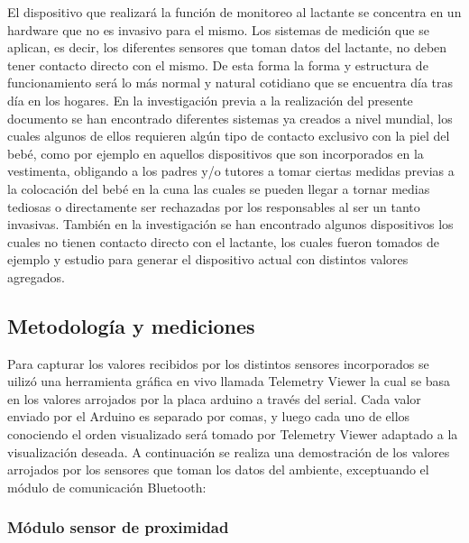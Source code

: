 \documentclass{IEEEtran}
\begin{document}
		El dispositivo que realizará la función de monitoreo al lactante se concentra en un hardware que no es invasivo para el mismo. Los sistemas de medición que se aplican, es decir, los diferentes sensores que toman datos del lactante, no deben tener contacto directo con el mismo. De esta forma la forma y estructura de funcionamiento será lo más normal y natural cotidiano que se encuentra día tras día en los hogares. En la investigación previa a la realización del presente documento se han encontrado diferentes sistemas ya creados a nivel mundial, los cuales algunos de ellos requieren algún tipo de contacto exclusivo con la piel del bebé, como por ejemplo en aquellos dispositivos que son incorporados en la vestimenta, obligando a los padres y/o tutores a tomar ciertas medidas previas a la colocación del bebé en la cuna las cuales se pueden llegar a tornar medias tediosas o directamente ser rechazadas por los responsables al ser un tanto invasivas. También en la investigación se han encontrado algunos dispositivos los cuales no tienen contacto directo con el lactante, los cuales fueron tomados de ejemplo y estudio para generar el dispositivo actual con distintos valores agregados.

		\subsection{Metodología y mediciones}
			
			Para capturar los valores recibidos por los distintos sensores incorporados se uilizó una herramienta gráfica en vivo llamada Telemetry Viewer \cite{telemetryviewer} la cual se basa en los valores arrojados por la placa arduino a través del serial. Cada valor enviado por el Arduino es separado por comas, y luego cada uno de ellos conociendo el orden visualizado será tomado por Telemetry Viewer adaptado a la visualización deseada. A continuación se realiza una demostración de los valores arrojados por los sensores que toman los datos del ambiente, exceptuando el módulo de comunicación Bluetooth:

			\subsubsection{Módulo sensor de proximidad}
\end{document}
